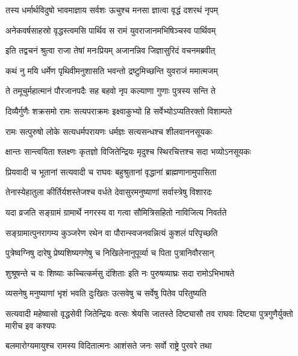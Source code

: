 \twolineshloka
{तस्य धर्मार्थविदुषो भावमाज्ञाय सर्वशः}
{ऊचुश्च मनसा ज्ञात्वा वृद्धं दशरथं नृपम्} %

\twolineshloka
{अनेकवर्षसाहस्रो वृद्धस्त्वमसि पार्थिव}
{स रामं युवराजानमभिषिञ्चस्व पार्थिवम्} %

\twolineshloka
{इति तद्वचनं श्रुत्वा राजा तेषां मनःप्रियम्}
{अजानन्निव जिज्ञासुरिदं वचनमब्रवीत्} %

\twolineshloka
{कथं नु मयि धर्मेण पृथिवीमनुशासति}
{भवन्तो द्रष्टुमिच्छन्ति युवराजं ममात्मजम्} %

\twolineshloka
{ते तमूचुर्महात्मानं पौरजानपदैः सह}
{बहवो नृप कल्याणा गुणाः पुत्रस्य सन्ति ते} %

\twolineshloka
{दिव्यैर्गुणैः शक्रसमो रामः सत्यपराक्रमः}
{इक्ष्वाकुभ्यो हि सर्वेभ्योऽप्यतिरक्तो विशाम्पते} %

\twolineshloka
{रामः सत्पुरुषो लोके सत्यधर्मपरायणः}
{धर्मज्ञः सत्यसन्धश्च शीलवाननसूयकः} %

\twolineshloka
{क्षान्तः सान्त्वयिता श्लक्ष्णः कृतज्ञो विजितेन्द्रियः}
{मृदुश्च स्थिरचित्तश्च सदा भव्योऽनसूयकः} %

\twolineshloka
{प्रियवादी च भूतानां सत्यवादी च राघवः}
{बहुश्रुतानां वृद्धानां ब्राह्मणानामुपासिता} %

\twolineshloka
{तेनास्येहातुला कीर्तिर्यशस्तेजश्च वर्धते}
{देवासुरमनुष्याणां सर्वास्त्रेषु विशारदः} %

\twolineshloka
{यदा व्रजति सङ्ग्रामं ग्रामार्थे नगरस्य वा}
{गत्वा सौमित्रिसहितो नाविजित्य निवर्तते} %

\twolineshloka
{सङ्ग्रामात्पुनरागम्य कुञ्जरेण रथेन वा}
{पौरान्स्वजनवन्नित्यं कुशलं परिपृच्छति} %

\twolineshloka
{पुत्रेष्वग्निषु दारेषु प्रेष्यशिष्यगणेषु च}
{निखिलेनानुपूर्व्या च पिता पुत्रानिवौरसान्} %

\twolineshloka
{शुश्रूषन्ते च वः शिष्याः कच्चित्कर्मसु दंशिताः}
{इति नः पुरुषव्याघ्रः सदा रामोऽभिभाषते} %

\twolineshloka
{व्यसनेषु मनुष्याणां भृशं भवति दुःखितः}
{उत्सवेषु च सर्वेषु पितेव परितुष्यति} %

\threelineshloka
{सत्यवादी महेष्वासो वृद्धसेवी जितेन्द्रियः}
{वत्सः श्रेयसि जातस्ते दिष्ट्यासौ तव राघवः}
{दिष्ट्या पुत्रगुणैर्युक्तो मारीच इव कश्यपः} %

\twolineshloka
{बलमारोग्यमायुश्च रामस्य विदितात्मनः}
{आशंसते जनः सर्वो राष्ट्रे पुरवरे तथा} %

